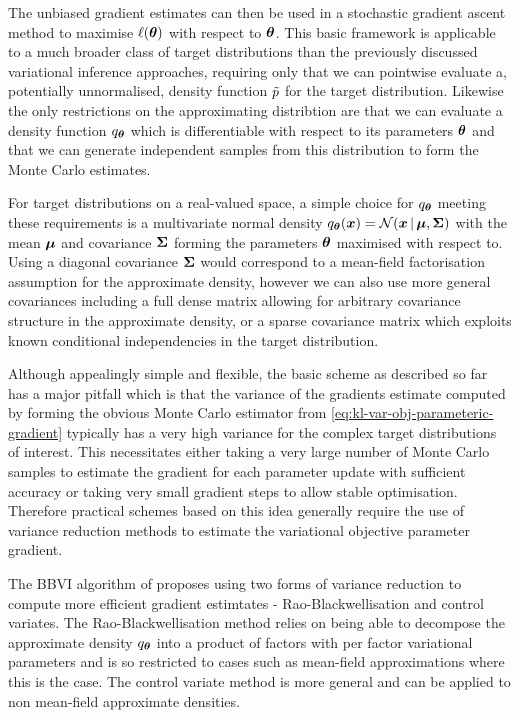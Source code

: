 The unbiased gradient estimates can then be used in a stochastic gradient ascent method \citep{robbins1951stochastic} to maximise $\ell(\boldsymbol{\theta})$ with respect to $\boldsymbol{\theta}$. This basic framework is applicable to a much broader class of target distributions than the previously discussed variational inference approaches, requiring only that we can pointwise evaluate a, potentially unnormalised, density function $\tilde{p}$ for the target distribution. Likewise the only restrictions on the approximating distribtion are that we can evaluate a density function $q_{\boldsymbol{\theta}}$ which is differentiable with respect to its parameters $\boldsymbol{\theta}$ and that we can generate independent samples from this distribution to form the Monte Carlo estimates. 

For target distributions on a real-valued space, a simple choice for $q_{\boldsymbol{\theta}}$ meeting these requirements is a multivariate normal density $q_{\vct{\theta}}(\vct{x}) = \nrm{\vct{x}\gvn\vct{\mu},\mtx{\Sigma}}$ with the mean $\boldsymbol{\mu}$ and covariance $\boldsymbol{\Sigma}$ forming the parameters $\boldsymbol{\theta}$ maximised with respect to. Using a diagonal covariance $\boldsymbol{\Sigma}$ would correspond to a mean-field factorisation assumption for the approximate density, however we can also use more general covariances including a full dense matrix allowing for arbitrary covariance structure in the approximate density, or a sparse covariance matrix which exploits known conditional independencies in the target distribution.

Although appealingly simple and flexible, the basic scheme as described so far has a major pitfall which is that the variance of the gradients estimate computed by forming the obvious Monte Carlo estimator from \eqref{eq:kl-var-obj-parameteric-gradient} typically has a very high variance for the complex target distributions of interest. This necessitates either taking a very large number of Monte Carlo samples to estimate the gradient for each parameter update with sufficient accuracy or taking very small gradient steps to allow stable optimisation. Therefore practical schemes based on this idea generally require the use of variance reduction methods to estimate the variational objective parameter gradient.

The \ac{BBVI} algorithm of \citep{ranganath2014black} proposes using two forms of variance reduction to compute more efficient gradient estimtates - Rao-Blackwellisation and control variates. The Rao-Blackwellisation method relies on being able to decompose the approximate density $q_{\boldsymbol{\theta}}$ into a product of factors with per factor variational parameters and is so restricted to cases such as mean-field approximations where this is the case. The control variate method is more general and can be applied to non mean-field approximate densities.

